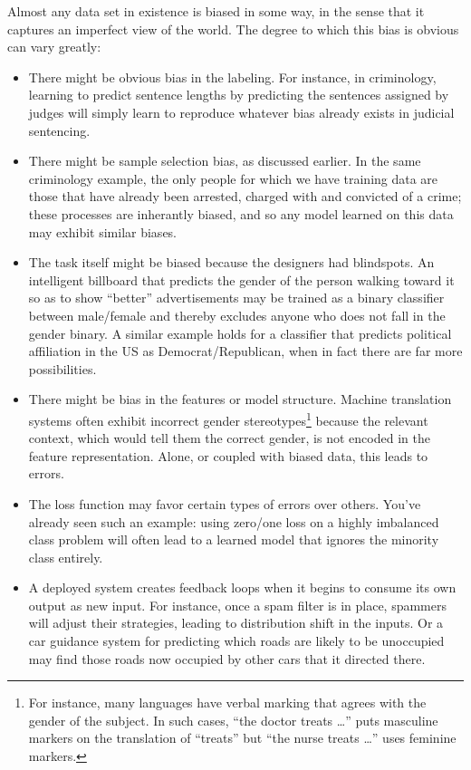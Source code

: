 Almost any data set in existence is biased in some way, in the sense that it captures an imperfect view of the world.
The degree to which this bias is obvious can vary greatly:
\begin{itemize}
\item There might be obvious bias in the labeling. For instance, in criminology, learning to predict sentence lengths by predicting the sentences assigned by judges will simply learn to reproduce whatever bias already exists in judicial sentencing.
\item There might be sample selection bias, as discussed earlier. In the same criminology example, the only people for which we have training data are those that have already been arrested, charged with and convicted of a crime; these processes are inherantly biased, and so any model learned on this data may exhibit similar biases.
\item The task itself might be biased because the designers had blindspots. An intelligent billboard that predicts the gender of the person walking toward it so as to show ``better'' advertisements may be trained as a binary classifier between male/female and thereby excludes anyone who does not fall in the gender binary. A similar example holds for a classifier that predicts political affiliation in the US as Democrat/Republican, when in fact there are far more possibilities.
\item There might be bias in the features or model structure. Machine translation systems often exhibit incorrect gender stereotypes\footnote{For instance, many languages have verbal marking that agrees with the gender of the subject. In such cases, ``the doctor treats \dots'' puts masculine markers on the translation of ``treats'' but ``the nurse treats \dots'' uses feminine markers.} because the relevant context, which would tell them the correct gender, is not encoded in the feature representation. Alone, or coupled with biased data, this leads to errors.
\item The loss function may favor certain types of errors over others. You've already seen such an example: using zero/one loss on a highly imbalanced class problem will often lead to a learned model that ignores the minority class entirely.
\item A deployed system creates feedback loops when it begins to consume its own output as new input. For instance, once a spam filter is in place, spammers will adjust their strategies, leading to distribution shift in the inputs. Or a car guidance system for predicting which roads are likely to be unoccupied may find those roads now occupied by other cars that it directed there.
\end{itemize}
